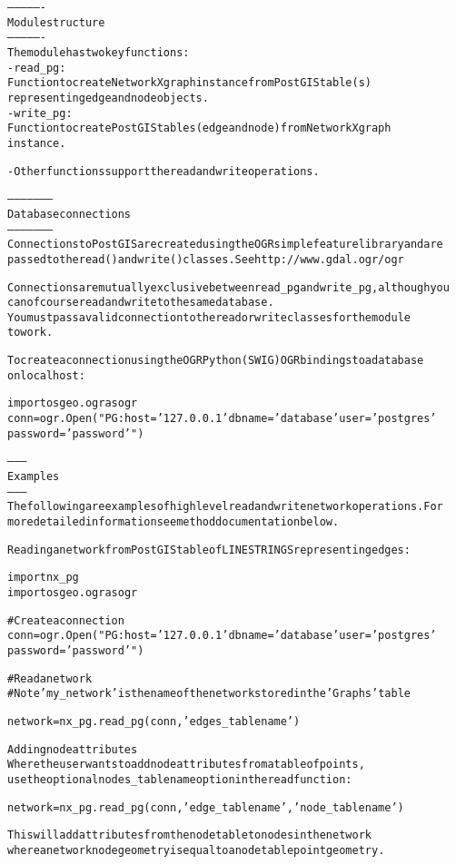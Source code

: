 \begin{alltt}
----------------
Module structure    
----------------
The module has two key functions:
    - read\_pg:
        Function to create NetworkX graph instance from PostGIS table(s) 
        representing edge and node objects.
    - write\_pg:
        Function to create PostGIS tables (edge and node) from NetworkX graph
        instance.
        
    - Other functions support the read and write operations.
    
--------------------
Database connections
--------------------
Connections to PostGIS are created using the OGR simple feature library and are
passed to the read() and write() classes. See http://www.gdal.ogr/ogr

Connections are mutually exclusive between read\_pg and write\_pg, although you 
can of course read and write to the same database. 
You must pass a valid connection to the read or write classes for the module 
to work.

To create a connection using the OGR Python (SWIG) OGR bindings to a database
on localhost:
    
    import osgeo.ogr as ogr
    conn = ogr.Open("PG: host='127.0.0.1' dbname='database' user='postgres'
                    password='password'")
    
--------
Examples
--------
The following are examples of high level read and write network operations. For
more detailed information see method documentation below.

Reading a network from PostGIS table of LINESTRINGS representing edges:
    
    import nx\_pg
    import osgeo.ogr as ogr
    
    \# Create a connection
    conn = ogr.Open("PG: host='127.0.0.1' dbname='database' user='postgres'
                    password='password'")

    \# Read a network
    \# Note 'my\_network' is the name of the network stored in the 'Graphs' table
    
    network = nx\_pg.read\_pg(conn, 'edges\_tablename')
    
    Adding node attributes
        Where the user wants to add node attributes from a table of points,
        use the optional nodes\_tablename option in the read function:
            
        network = nx\_pg.read\_pg(conn, 'edge\_tablename', 'node\_tablename')
        
        This will add attributes from the node table to nodes in the network
        where a network node geometry is equal to a node table point geometry. 
        

\end{alltt}
